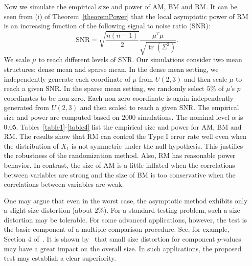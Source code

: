 \documentclass[3p]{elsarticle}
\DeclareMathOperator{\mytr}{tr}
\theoremstyle{plain}
\theoremstyle{definition}
\theoremstyle{remark}
\begin{document}
Now we simulate the empirical size and power of AM, BM and RM.
It can be seen from (i) of Theorem~\ref{theoremPower} that the local asymptotic power of RM is an increasing function of the following signal to noise ratio (SNR):
\begin{equation*}
    \mathrm{SNR}=\sqrt{\frac{n(n-1)}{2}}
    \frac{\mu^T \mu}{\sqrt{\mytr (\Sigma^2)}}.
\end{equation*}
We scale $\mu$ to reach different levels of SNR\@.
Our simulations consider two mean structures: dense mean and sparse mean.
In the dense mean setting,  we independently generate each coordinate of $\mu$ from $U(2,3)$ and then scale $\mu$ to reach a given SNR\@.
In the sparse mean setting, we randomly select $5\%$ of $\mu$'s $p$ coordinates to be non-zero.
Each non-zero coordinate is again independently generated from $U(2,3)$ and then scaled to reach a given SNR\@.
The empirical size and power are computed based on $2000$ simulations.
The nominal level $\alpha$ is $0.05$.
Tables~\ref{table1}-\ref{table4} list the empirical size and power for AM, BM and RM.
The results show that RM can control the Type I error rate well even when the distribution of $X_1$ is not symmetric under the null hypothesis.
This justifies the robustness of the randomization method.
Also, RM has reasonable power behavior.
In contrast, the size of AM is a little inflated when the correlations between variables are strong and the size of BM is too conservative when the correlations between variables are weak.

One may argue that even in the worst case, the asymptotic method exhibits only a slight size distortion (about 2\%).
For a standard testing problem, such a size distortion may be tolerable.
For some advanced applications, however, the test is the basic component of a multiple comparison procedure.
See, for example, Section 4 of~\cite{Chen2010A}.
It is shown by~\cite{fan2007to} that small size distortion for component $p$-values may have a great impact on the overall size.
In such applications, the proposed test may establish a clear superiority.

\end{document}
